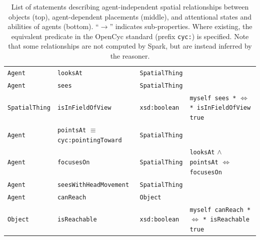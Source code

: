 \documentclass[preprint,3p,times]{elsarticle}
\newcommand{\concept}[1]{{\small \texttt{#1}}}
\begin{document}
\begin{table}[h]
\begin{tabular}{p{1.5cm}lp{2cm}p{5cm}}
		\hline
		 \concept{Agent}  & \concept{looksAt}  & \concept{SpatialThing} \\
		 \concept{Agent}  & \concept{sees}  &  \concept{SpatialThing}  &    \\ 
		 \concept{SpatialThing}  & \concept{isInFieldOfView}  & \concept{xsd:boolean}  & \par \tiny \concept{myself sees *} $\Leftrightarrow$ \concept{* isInFieldOfView true} \\ 
		 \concept{Agent}  & \concept{pointsAt} $\equiv$ \concept{cyc:pointingToward}  & \concept{SpatialThing} \\ 
		 \concept{Agent}  & \concept{focusesOn}  &  \concept{SpatialThing}  &  \par \tiny \concept{looksAt} $\wedge$ \concept{pointsAt} $\Leftrightarrow$ \concept{focusesOn} \\
		\concept{Agent} & \concept{seesWithHeadMovement} &  \concept{SpatialThing} \\
        \concept{Agent} & \concept{canReach} &  \concept{Object} & \\ 
        \concept{Object} & \concept{isReachable} &  \concept{xsd:boolean} & \par \tiny \concept{myself canReach *} $\Leftrightarrow$ \concept{* isReachable true} \\ 

	\end{tabular}

    \caption{List of statements describing agent-independent spatial
        relationships between objects (top), agent-dependent placements
        (middle), and attentional states and abilities of agents (bottom).
        ``$\rightarrow$'' indicates sub-properties. Where existing, the
        equivalent predicate in the {\sc OpenCyc} standard (prefix
        \concept{cyc:}) is specified. Note that some relationships are not
        computed by {\sc Spark}, but are instead inferred by the reasoner.}

	\label{facts}
\end{table}
\renewcommand{\concept}[1]{{\small \texttt{#1}}}
\end{document}
